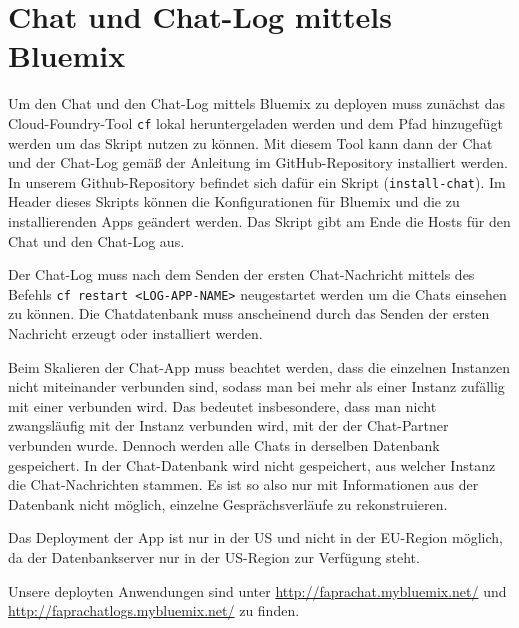 \section{Chat und Chat-Log mittels Bluemix}

Um den Chat und den Chat-Log mittels Bluemix zu deployen muss zunächst das Cloud-Foundry-Tool \verb|cf| lokal heruntergeladen werden und dem Pfad hinzugefügt werden um das Skript nutzen zu können. Mit diesem Tool kann dann der Chat und der Chat-Log gemäß der Anleitung im GitHub-Repository installiert werden. In unserem Github-Repository befindet sich dafür ein Skript (\verb|install-chat|). Im Header dieses Skripts können die Konfigurationen für Bluemix und die zu installierenden Apps geändert werden. Das Skript gibt am Ende die Hosts für den Chat und den Chat-Log aus.

Der Chat-Log muss nach dem Senden der ersten Chat-Nachricht mittels des Befehls \verb|cf restart <LOG-APP-NAME>| neugestartet werden um die Chats einsehen zu können. Die Chatdatenbank muss anscheinend durch das Senden der ersten Nachricht erzeugt oder installiert werden.

Beim Skalieren der Chat-App muss beachtet werden, dass die einzelnen Instanzen nicht miteinander verbunden sind, sodass man bei mehr als einer Instanz zufällig mit einer verbunden wird. Das bedeutet insbesondere, dass man nicht zwangsläufig mit der Instanz verbunden wird, mit der der Chat-Partner verbunden wurde. Dennoch werden alle Chats in derselben Datenbank gespeichert. In der Chat-Datenbank wird nicht gespeichert, aus welcher Instanz die Chat-Nachrichten stammen. Es ist so also nur mit Informationen aus der Datenbank nicht möglich, einzelne Gesprächsverläufe zu rekonstruieren.

Das Deployment der App ist nur in der US und nicht in der EU-Region möglich, da der Datenbankserver nur in der US-Region zur Verfügung steht.

Unsere deployten Anwendungen sind unter \url{http://faprachat.mybluemix.net/} und \url{http://faprachatlogs.mybluemix.net/}  zu finden.